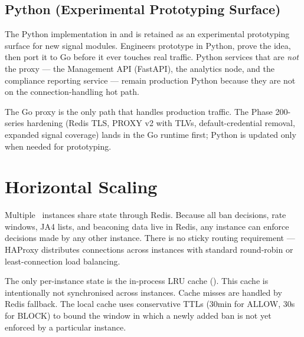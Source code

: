 \subsection{Python (Experimental Prototyping Surface)}

The Python implementation in  and  is retained as
an experimental prototyping surface for new signal modules. Engineers prototype in
Python, prove the idea, then port it to Go before it ever touches real traffic.
Python services that are \emph{not} the proxy --- the Management API (FastAPI), the
analytics node, and the compliance reporting service --- remain production Python
because they are not on the connection-handling hot path.

\begin{notebox}
The Go proxy is the only path that handles production traffic. The Phase 200-series
hardening (Redis TLS, PROXY v2 with TLVs, default-credential removal, expanded
signal coverage) lands in the Go runtime first; Python is updated only when needed
for prototyping.
\end{notebox}

\section{Horizontal Scaling}

Multiple \ja\ instances share state through Redis. Because all ban decisions, rate
windows, JA4 lists, and beaconing data live in Redis, any instance can enforce
decisions made by any other instance. There is no sticky routing requirement — HAProxy
distributes connections across instances with standard round-robin or least-connection
load balancing.

The only per-instance state is the in-process LRU cache ().
This cache is intentionally not synchronised across instances. Cache misses are handled
by Redis fallback. The local cache uses conservative TTLs (30min for ALLOW, 30s for
BLOCK) to bound the window in which a newly added ban is not yet enforced by a
particular instance.
